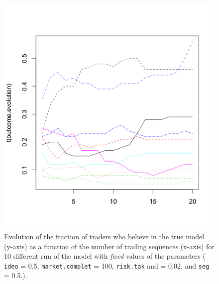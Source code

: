 \documentclass{sig-alternate}
\begin{document}
	\begin{figure}
		\includegraphics[scale = 0.4]{random.png}
		\caption{Evolution of the fraction of traders who believe in the true model (y-axis) as a function of the number of trading sequences (x-axis) for 10 different run of the model with \emph{fixed} values of the parameters ( \texttt{ideo} = 0.5,
			 \texttt{market.complet} = 100,
			 \texttt{risk.tak} and = 0.02, and
			  \texttt{seg} = 0.5.). \label{random}}
	\end{figure}
	
	
	
	
\end{document}
